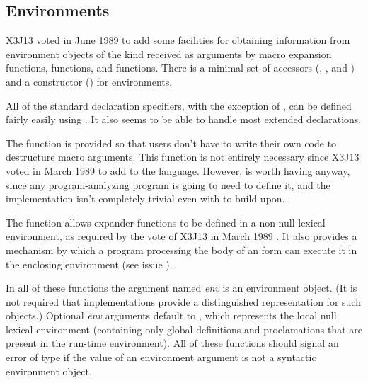 \begin{newer}
\section{Environments}

X3J13 voted in June 1989  to add some facilities for obtaining information
from environment objects of the kind received as arguments
by macro expansion functions,  functions,
and  functions.
There is a minimal set of accessors (,
, and ) and a constructor
() for environments.

All of the standard declaration specifiers, with the exception of ,
can be defined fairly easily using .  It also
seems to be able to handle most extended declarations.

The function  is provided so that
users don't have to write their
  own code to destructure macro arguments.
This function is not entirely necessary since X3J13 voted
in March 1989 
to add  to the language.
  However,  is worth having anyway, since any program-analyzing
  program is going to need to define it, and the implementation isn't completely
  trivial even with  to build upon.

  The function  allows expander functions to be defined in a non-null
  lexical environment, as required by the vote of X3J13 in
  March 1989 .  It
  also provides a mechanism by which a program processing
  the body of an  form
  can execute it in the enclosing environment (see issue
  ).

In all of these functions the argument named {\it env} is an environment
object.  (It is not required that implementations
 provide a distinguished representation for such objects.)  Optional {\it env}
 arguments default to , which represents the local null lexical environment
 (containing only global definitions and proclamations that are present in the
 run-time environment).  All of these functions should signal an error of type
  if the value of an environment argument is not a syntactic
 environment object.


\end{newer}
